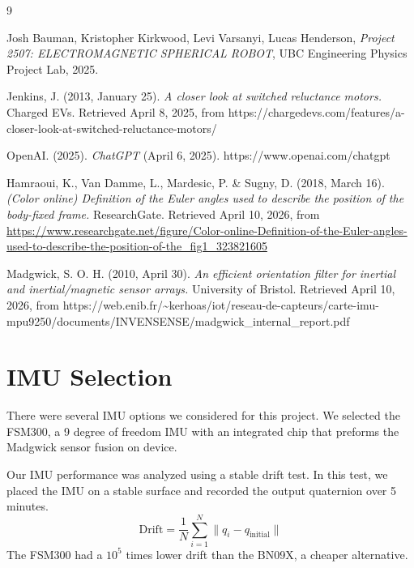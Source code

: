 \documentclass[11pt]{article}
\begin{document}
\begin{thebibliography}{9}

Josh Bauman, Kristopher Kirkwood, Levi Varsanyi, Lucas Henderson, \textit{Project 2507: ELECTROMAGNETIC SPHERICAL ROBOT}, UBC Engineering Physics Project Lab, 2025.

Jenkins, J. (2013, January 25). \textit{A closer look at switched reluctance motors.} Charged EVs. Retrieved April 8, 2025, from https://chargedevs.com/features/a-closer-look-at-switched-reluctance-motors/

OpenAI. (2025). \textit{ChatGPT} (April 6, 2025). https://www.openai.com/chatgpt

Hamraoui, K., Van Damme, L., Mardesic, P. \& Sugny, D. (2018, March 16). \textit{(Color online) Definition of the Euler angles used to describe the position of the body-fixed frame.} ResearchGate. Retrieved April 10, 2026, from \url{https://www.researchgate.net/figure/Color-online-Definition-of-the-Euler-angles-used-to-describe-the-position-of-the_fig1_323821605}

Madgwick, S. O. H. (2010, April 30). \textit{An efficient orientation filter for inertial and inertial/magnetic sensor arrays.} University of Bristol. Retrieved April 10, 2026, from https://web.enib.fr/\textasciitilde kerhoas/iot/reseau-de-capteurs/carte-imu-mpu9250/documents/INVENSENSE/madgwick\_internal\_report.pdf


\end{thebibliography}
\newpage

\appendix
\setcounter{section}{0}  %


\section{IMU Selection}
\label{sec:IMU_selection}
There were several IMU options we considered for this project. We selected the FSM300, a 9 degree of freedom IMU with an integrated chip that preforms the Madgwick sensor fusion on device. 

Our IMU performance was analyzed using a stable drift test. In this test, we placed the IMU on a stable surface and recorded the output quaternion over 5 minutes.
\begin{equation}
    \text{Drift} = \frac{1}{N} \sum_{i=1}^{N} \| q_i - q_{\text{initial}} \|
\end{equation}
The FSM300 had a $10^5$ times lower drift than the BN09X, a cheaper alternative.  
\end{document}
